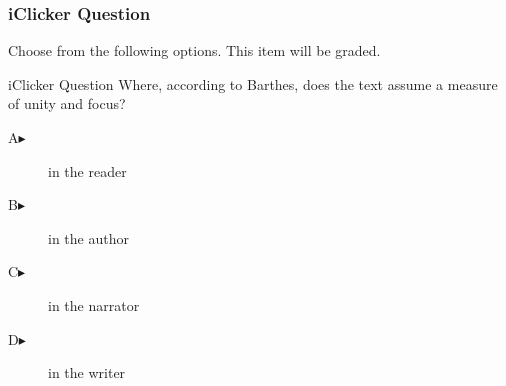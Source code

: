 \begin{frame}
  \frametitle{iClicker Question}
Choose from the following options. This item will be graded.
\begin{block}{iClicker Question}
Where, according to Barthes, does the text assume a measure of unity
and focus?
\end{block}
\begin{description}
\item[A\hspace{.2in}$\blacktriangleright$] in the reader
\item[B\hspace{.2in}$\blacktriangleright$] in the author
\item[C\hspace{.2in}$\blacktriangleright$] in the narrator
\item[D\hspace{.2in}$\blacktriangleright$] in the writer
\end{description}
\end{frame}

